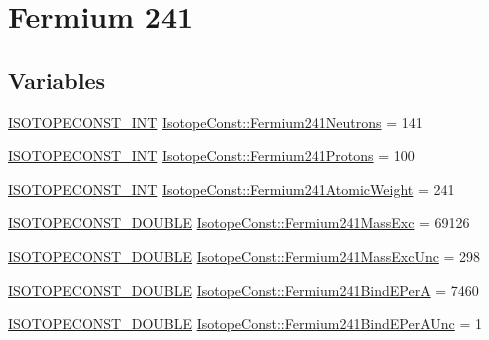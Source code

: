 \hypertarget{group___isotope_const-_fermium-_fm241}{}\section{Fermium 241}
\label{group___isotope_const-_fermium-_fm241}
\subsection*{Variables}
\begin{DoxyCompactItemize}
\item 
\mbox{\hyperlink{group___isotope_const-_macros_ga5f18360b3e99483a35c32d789e62621c}{I\+S\+O\+T\+O\+P\+E\+C\+O\+N\+S\+T\+\_\+\+I\+NT}} \mbox{\hyperlink{group___isotope_const-_fermium-_fm241_gad8ee965546ac2176e3071946caf61ee4}{Isotope\+Const\+::\+Fermium241\+Neutrons}} = 141
\item 
\mbox{\hyperlink{group___isotope_const-_macros_ga5f18360b3e99483a35c32d789e62621c}{I\+S\+O\+T\+O\+P\+E\+C\+O\+N\+S\+T\+\_\+\+I\+NT}} \mbox{\hyperlink{group___isotope_const-_fermium-_fm241_gaac1be3250a516f3c328f0ba0f34a39ef}{Isotope\+Const\+::\+Fermium241\+Protons}} = 100
\item 
\mbox{\hyperlink{group___isotope_const-_macros_ga5f18360b3e99483a35c32d789e62621c}{I\+S\+O\+T\+O\+P\+E\+C\+O\+N\+S\+T\+\_\+\+I\+NT}} \mbox{\hyperlink{group___isotope_const-_fermium-_fm241_gac48969b95bcbb3997af04f0e85ccc840}{Isotope\+Const\+::\+Fermium241\+Atomic\+Weight}} = 241
\item 
\mbox{\hyperlink{group___isotope_const-_macros_ga8f45a7272ce02c0b4c65c44636ed719a}{I\+S\+O\+T\+O\+P\+E\+C\+O\+N\+S\+T\+\_\+\+D\+O\+U\+B\+LE}} \mbox{\hyperlink{group___isotope_const-_fermium-_fm241_gafaea42d98eb255d552a27d11d9331558}{Isotope\+Const\+::\+Fermium241\+Mass\+Exc}} = 69126
\item 
\mbox{\hyperlink{group___isotope_const-_macros_ga8f45a7272ce02c0b4c65c44636ed719a}{I\+S\+O\+T\+O\+P\+E\+C\+O\+N\+S\+T\+\_\+\+D\+O\+U\+B\+LE}} \mbox{\hyperlink{group___isotope_const-_fermium-_fm241_ga6789430ccbbd761eaefca33705de8d5c}{Isotope\+Const\+::\+Fermium241\+Mass\+Exc\+Unc}} = 298
\item 
\mbox{\hyperlink{group___isotope_const-_macros_ga8f45a7272ce02c0b4c65c44636ed719a}{I\+S\+O\+T\+O\+P\+E\+C\+O\+N\+S\+T\+\_\+\+D\+O\+U\+B\+LE}} \mbox{\hyperlink{group___isotope_const-_fermium-_fm241_gaf63ced322a4c28c53a291984f1794c68}{Isotope\+Const\+::\+Fermium241\+Bind\+E\+PerA}} = 7460
\item 
\mbox{\hyperlink{group___isotope_const-_macros_ga8f45a7272ce02c0b4c65c44636ed719a}{I\+S\+O\+T\+O\+P\+E\+C\+O\+N\+S\+T\+\_\+\+D\+O\+U\+B\+LE}} \mbox{\hyperlink{group___isotope_const-_fermium-_fm241_gabebbb0cd97944c54dd296b98ab654b13}{Isotope\+Const\+::\+Fermium241\+Bind\+E\+Per\+A\+Unc}} = 1

\end{DoxyCompactItemize}
